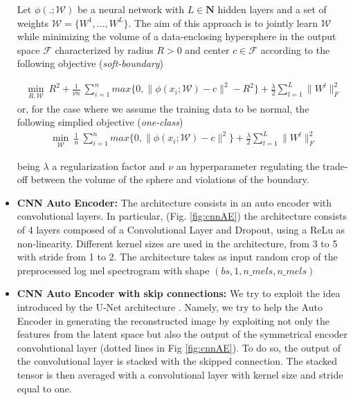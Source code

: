 \documentclass{article}
\begin{document}
\begin{itemize}
	Let $\phi(.; \mathcal{W})$ be a neural network with $L \in \mathbf{N}$ hidden layers and a set of weights $\mathcal{W} = \{ W^1, ..., W^L\}$. The aim of this approach is to jointly learn $\mathcal{W}$ while minimizing the volume of a data-enclosing hypersphere in the output space $\mathcal{F}$ characterized by radius $R > 0$ and center $c \in \mathcal{F}$ according to the following objective (\textit{soft-boundary})
    
    \begin{align*}
	    \min_{R, \mathcal{W}} \ R^2 + \frac{1}{\nu n} \ \sum_{i=1}^{n} max \{0, \|\phi(x_i; \mathcal{W}) - c \|^2 - R^2\} + \frac{\lambda}{2} \sum_{l=1}^{L} \|W^{l}\|^2_F
	\end{align*}
	or, for the case where we assume the training data to be normal, the following simplied objective (\textit{one-class})
	  \begin{align*}
	    \min_{\mathcal{W}} \ \frac{1}{n} \ \sum_{i=1}^{n} max \{0, \|\phi(x_i; \mathcal{W}) - c \|^2\} + \frac{\lambda}{2} \sum_{l=1}^{L} \|W^{l}\|^2_F
	\end{align*}
	
	being $\lambda$ a regularization factor and $\nu$ an hyperparameter regulating the trade-off between the volume of the sphere and violations of the boundary. 
	
	\item  \textbf{CNN Auto Encoder:} The architecture consists in an auto encoder with convolutional layers. In particular, (Fig. \ref{fig:cnnAE}) the architecture consists of 4 layers composed of a Convolutional Layer and Dropout, using a ReLu as non-linearity. Different kernel sizes are used in the architecture, from 3 to 5 with stride from 1 to 2.  The architecture takes as input random crop of the preprocessed log mel spectrogram with shape $(bs, 1, n\_mels, n\_mels)$
	
	\item \textbf{CNN Auto Encoder with skip connections:} We try to exploit the idea introduced by the U-Net architecture \cite{Unet}. Namely, we try to help the Auto Encoder in generating the reconstructed image by exploiting not only the features from the latent space but also the output of the symmetrical encoder convolutional layer (dotted lines in Fig \ref{fig:cnnAE}). To do so, the output of the convolutional layer is stacked with the skipped connection. The stacked tensor is then averaged with a convolutional layer with kernel size and stride equal to one.  


\end{itemize}
\end{document}
